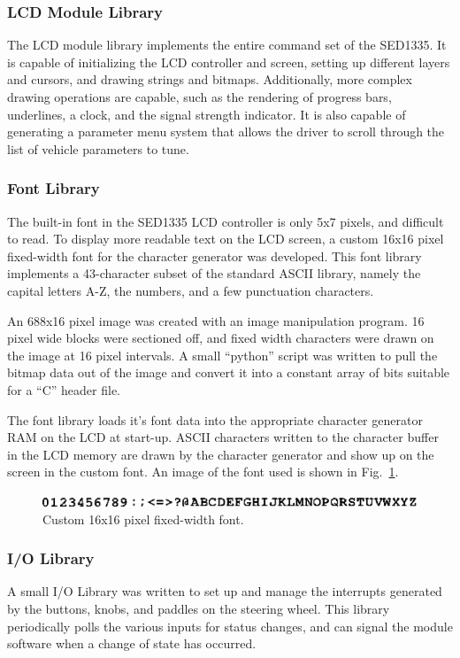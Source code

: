 \subsubsection{LCD Module Library}

The LCD module library implements the entire command set of the SED1335. It is capable of initializing the LCD controller and screen, setting up different layers and cursors, and drawing strings and bitmaps. Additionally, more complex drawing operations are capable, such as the rendering of progress bars, underlines, a clock, and the signal strength indicator. It is also capable of generating a parameter menu system that allows the driver to scroll through the list of vehicle parameters to tune.

\subsubsection{Font Library}
\label{sec:lcd_module_font_loading}

The built-in font in the SED1335 LCD controller is only 5x7 pixels, and difficult to read. To display more readable text on the LCD screen, a custom 16x16 pixel fixed-width font for the character generator was developed. This font library implements a 43-character subset of the standard ASCII library, namely the capital letters A-Z, the numbers, and a few punctuation characters.

An 688x16 pixel image was created with an image manipulation program. 16 pixel wide blocks were sectioned off, and fixed width characters were drawn on the image at 16 pixel intervals. A small ``python'' script was written to pull the bitmap data out of the image and convert it into a constant array of bits suitable for a ``C'' header file.

The font library loads it's font data into the appropriate character generator RAM on the LCD at start-up. ASCII characters written to the character buffer in the LCD memory are drawn by the character generator and show up on the screen in the custom font. An image of the font used is shown in Fig.\ \ref{fig:driver_interface_font}.

\begin{figure}[H]
 \centering
 \includegraphics[scale=1]{implementation/figures/driver_interface_font.eps}
 \caption{Custom 16x16 pixel fixed-width font.}
 \label{fig:driver_interface_font}
\end{figure}

\subsubsection{I/O Library}

A small I/O Library was written to set up and manage the interrupts generated by the buttons, knobs, and paddles on the steering wheel. This library periodically polls the various inputs for status changes, and can signal the module software when a change of state has occurred.
